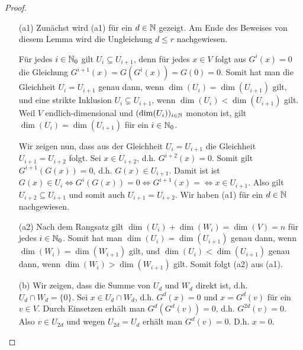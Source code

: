 \begin{proof}\
	\begin{itemize}
		\item[(a1)]
			Zunächst wird (a1) für ein $ d \in \mathbb N $ gezeigt. Am Ende des Beweises von diesem Lemma wird die Ungleichung $ d \leq r $ nachgewiesen.
			
			Für jedes $ i \in \mathbb N_0 $ gilt $ U_i \subseteq U_{i+1} $, denn für jedes $ x \in V $ folgt aus $ G^i(x) = 0 $ die Gleichung $ G^{i+1}(x) = G(G^i(x)) = G(0) = 0 $. Somit hat man die Gleichheit $ U_i = U_{i+1} $ genau dann, wenn $ \dim(U_i) = \dim(U_{i+1}) $ gilt, und eine strikte Inklusion $ U_i \varsubsetneq U_{i+1} $, wenn $ \dim(U_i) < \dim(U_{i+1}) $ gilt. Weil $ V $ endlich-dimensional und $ (\dim(U_i)){}_{i \in \mathbb N} $ monoton ist, gilt $ \dim(U_i) = \dim(U_{i+1}) $ für ein $ i \in \mathbb N_0 $.
			
			Wir zeigen nun, dass aus der Gleichheit $ U_i = U_{i+1} $ die Gleichheit $ U_{i+1} = U_{i+2} $ folgt. Sei $ x \in U_{i+2} $, d.h. $ G^{i+2}(x) = 0 $. Somit gilt $ G^{i+1}(G(x)) = 0 $, d.h. $ G(x) \in U_{i+1} $. Damit ist ist $ G(x) \in U_i \Leftrightarrow G^i(G(x)) = 0 \Leftrightarrow G^{i+1}(x) = \Leftrightarrow x \in U_{i+1} $. Also gilt $ U_{i+2} \subseteq U_{i+1} $ und somit auch $ U_{i+1} = U_{i+2} $. Wir haben (a1) für ein $ d \in \mathbb N $ nachgewiesen.
		\item[(a2)]
			Nach dem Rangsatz gilt $ \dim(U_i) + \dim(W_i) = \dim(V) = n $ für jedes $ i \in \mathbb N_0 $. Somit hat man $ \dim(U_i) = \dim(U_{i+1}) $ genau dann, wenn $ \dim(W_i) = \dim(W_{i+1}) $ gilt, und $ \dim(U_i) < \dim(U_{i+1}) $ genau dann, wenn $ \dim(W_i) > \dim(W_{i+1}) $ gilt. Somit folgt (a2) aus (a1).
		\item[(b)]
			Wir zeigen, dass die Summe von $ U_d $ und $ W_d $ direkt ist, d.h. $ U_d \cap W_d = \{0\} $. Sei $ x \in U_d \cap W_d $, d.h. $ G^d(x) = 0 $ und $ x = G^d(v) $ für ein $ v \in V $. Durch Einsetzen erhält man $ G^d(G^d(v)) = 0 $, d.h. $ G^{2d}(v) = 0 $. Also $ v \in U_{2d} $ und wegen $ U_{2d} = U_d $ erhält man $ G^d(v) = 0 $. D.h. $ x = 0 $.
			

\end{itemize}
\end{proof}

